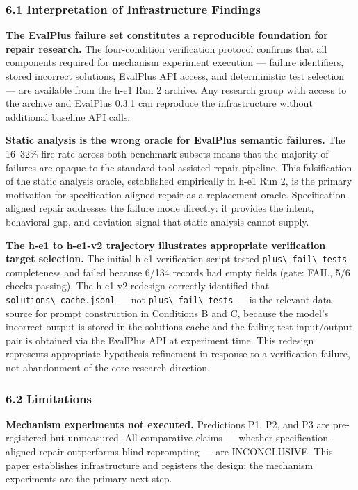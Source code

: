 
\subsubsection{6.1 Interpretation of Infrastructure Findings}

\textbf{The EvalPlus failure set constitutes a reproducible foundation for repair research.} The four-condition verification protocol confirms that all components required for mechanism experiment execution --- failure identifiers, stored incorrect solutions, EvalPlus API access, and deterministic test selection --- are available from the h-e1 Run 2 archive. Any research group with access to the archive and EvalPlus 0.3.1 can reproduce the infrastructure without additional baseline API calls.

\textbf{Static analysis is the wrong oracle for EvalPlus semantic failures.} The 16--32\% fire rate across both benchmark subsets means that the majority of failures are opaque to the standard tool-assisted repair pipeline. This falsification of the static analysis oracle, established empirically in h-e1 Run 2, is the primary motivation for specification-aligned repair as a replacement oracle. Specification-aligned repair addresses the failure mode directly: it provides the intent, behavioral gap, and deviation signal that static analysis cannot supply.

\textbf{The h-e1 to h-e1-v2 trajectory illustrates appropriate verification target selection.} The initial h-e1 verification script tested \texttt{plus\textbackslash \_fail\textbackslash \_tests} completeness and failed because 6/134 records had empty fields (gate: FAIL, 5/6 checks passing). The h-e1-v2 redesign correctly identified that \texttt{solutions\textbackslash \_cache.jsonl} --- not \texttt{plus\textbackslash \_fail\textbackslash \_tests} --- is the relevant data source for prompt construction in Conditions B and C, because the model's incorrect output is stored in the solutions cache and the failing test input/output pair is obtained via the EvalPlus API at experiment time. This redesign represents appropriate hypothesis refinement in response to a verification failure, not abandonment of the core research direction.

\subsubsection{6.2 Limitations}

\textbf{Mechanism experiments not executed.} Predictions P1, P2, and P3 are pre-registered but unmeasured. All comparative claims --- whether specification-aligned repair outperforms blind reprompting --- are INCONCLUSIVE. This paper establishes infrastructure and registers the design; the mechanism experiments are the primary next step.

